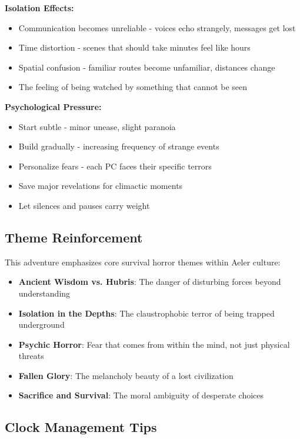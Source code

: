 \documentclass[11pt]{article}
\begin{document}
\textbf{Isolation Effects:}
\begin{itemize}
\item Communication becomes unreliable - voices echo strangely, messages get lost
\item Time distortion - scenes that should take minutes feel like hours
\item Spatial confusion - familiar routes become unfamiliar, distances change
\item The feeling of being watched by something that cannot be seen
\end{itemize}

\textbf{Psychological Pressure:}
\begin{itemize}
\item Start subtle - minor unease, slight paranoia
\item Build gradually - increasing frequency of strange events
\item Personalize fears - each PC faces their specific terrors
\item Save major revelations for climactic moments
\item Let silences and pauses carry weight
\end{itemize}

\subsection{Theme Reinforcement}

This adventure emphasizes core survival horror themes within Aeler culture:
\begin{itemize}
\item \textbf{Ancient Wisdom vs. Hubris}: The danger of disturbing forces beyond understanding
\item \textbf{Isolation in the Depths}: The claustrophobic terror of being trapped underground
\item \textbf{Psychic Horror}: Fear that comes from within the mind, not just physical threats
\item \textbf{Fallen Glory}: The melancholy beauty of a lost civilization
\item \textbf{Sacrifice and Survival}: The moral ambiguity of desperate choices
\end{itemize}

\subsection{Clock Management Tips}
\end{document}

